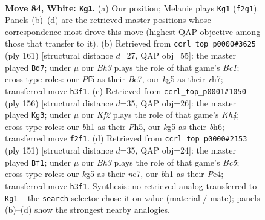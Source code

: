 \documentclass[11pt]{article}
\begin{document}
\clearpage

\begin{figure}[p]\centering
\begin{subfigure}{0.46\textwidth}\centering
\resizebox{\linewidth}{!}{%
\newchessgame
\chessboard[
  setfen={8/P1NR4/8/5Pk1/np4P1/7B/5K1P/7b w - - 1 84},
  showmover=false,
  pgfstyle=straightmove, color=movearrow, markmove={f2-g1}
]}
\caption{}
\end{subfigure}\hfill
\begin{subfigure}{0.46\textwidth}\centering
\resizebox{\linewidth}{!}{%
\newchessgame
\chessboard[
  setfen={2b1k3/4b2R/4p3/Bp1pK3/8/1P6/8/8 b - - 43 81},
  showmover=false,
  pgfstyle=straightmove, color=movearrow, markmove={c8-d7}
]}
\caption{}
\end{subfigure}
\\[4pt]
\begin{subfigure}{0.46\textwidth}\centering
\resizebox{\linewidth}{!}{%
\newchessgame
\chessboard[
  setfen={8/7p/7b/3kPp1P/5P1K/8/7B/8 w - - 57 79},
  showmover=false,
  pgfstyle=straightmove, color=movearrow, markmove={h4-g3}
]}
\caption{}
\end{subfigure}\hfill
\begin{subfigure}{0.46\textwidth}\centering
\resizebox{\linewidth}{!}{%
\newchessgame
\chessboard[
  setfen={8/2N5/6k1/1p5p/2b1pP1K/P3P3/8/8 b - - 21 76},
  showmover=false,
  pgfstyle=straightmove, color=movearrow, markmove={c4-f1}
]}
\caption{}
\end{subfigure}
\caption{\textbf{Move 84, White: \texttt{Kg1}.} (a) Our position; Melanie plays \texttt{Kg1} (\texttt{f2g1}). Panels (b)--(d) are the retrieved master positions whose correspondence most drove this move (highest QAP objective among those that transfer to it). (b) Retrieved from \texttt{ccrl\_top\_p0000\#3625} (ply 161) [structural distance $d$=27, QAP obj=55]: the master played \texttt{Bd7}; under $\mu$ our \emph{Bh3} plays the role of that game's \emph{Bc1}; cross-type roles: our \emph{P}f5 as their \emph{B}e7, our \emph{k}g5 as their \emph{r}h7; transferred move \texttt{h3f1}. (c) Retrieved from \texttt{ccrl\_top\_p0001\#1050} (ply 156) [structural distance $d$=35, QAP obj=26]: the master played \texttt{Kg3}; under $\mu$ our \emph{Kf2} plays the role of that game's \emph{Kh4}; cross-type roles: our \emph{b}h1 as their \emph{P}h5, our \emph{k}g5 as their \emph{b}h6; transferred move \texttt{f2f1}. (d) Retrieved from \texttt{ccrl\_top\_p0000\#2153} (ply 151) [structural distance $d$=35, QAP obj=24]: the master played \texttt{Bf1}; under $\mu$ our \emph{Bh3} plays the role of that game's \emph{Bc5}; cross-type roles: our \emph{k}g5 as their \emph{n}c7, our \emph{b}h1 as their \emph{P}e4; transferred move \texttt{h3f1}. Synthesis: no retrieved analog transferred to \texttt{Kg1} -- the \texttt{search} selector chose it on value (material / mate); panels (b)--(d) show the strongest nearby analogies.}
\label{fig:thought-m166}
\end{figure}
\end{document}
